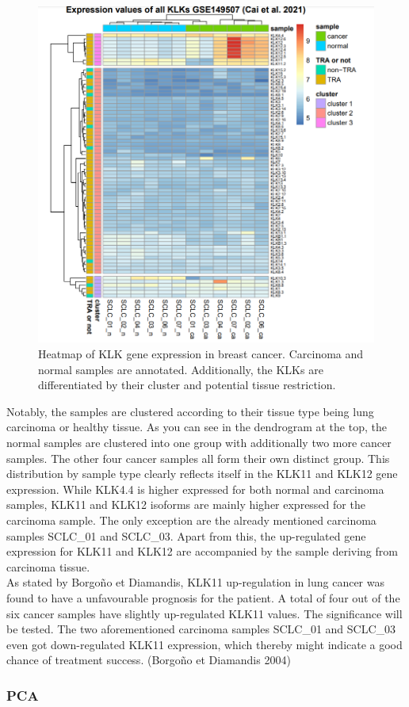 \documentclass[
]{article}
\begin{document}
\begin{figure}

{\centering \includegraphics[width=0.5\linewidth]{images/Heatmap_lung} 

}

\caption{Heatmap of KLK gene expression in breast cancer. Carcinoma and normal samples are annotated. Additionally, the KLKs are differentiated by their cluster and potential tissue restriction.}\label{fig:Heatmap - lung }
\end{figure}

Notably, the samples are clustered according to their tissue type being
lung carcinoma or healthy tissue. As you can see in the dendrogram at
the top, the normal samples are clustered into one group with
additionally two more cancer samples. The other four cancer samples all
form their own distinct group. This distribution by sample type clearly
reflects itself in the KLK11 and KLK12 gene expression. While KLK4.4 is
higher expressed for both normal and carcinoma samples, KLK11 and KLK12
isoforms are mainly higher expressed for the carcinoma sample. The only
exception are the already mentioned carcinoma samples SCLC\_01 and
SCLC\_03. Apart from this, the up-regulated gene expression for KLK11
and KLK12 are accompanied by the sample deriving from carcinoma
tissue.\\
As stated by Borgoño et Diamandis, KLK11 up-regulation in lung cancer
was found to have a unfavourable prognosis for the patient. A total of
four out of the six cancer samples have slightly up-regulated KLK11
values. The significance will be tested. The two aforementioned
carcinoma samples SCLC\_01 and SCLC\_03 even got down-regulated KLK11
expression, which thereby might indicate a good chance of treatment
success. (Borgoño et Diamandis 2004)

\hypertarget{pca-1}{%
\subsubsection{PCA}\label{pca-1}}
\end{document}

